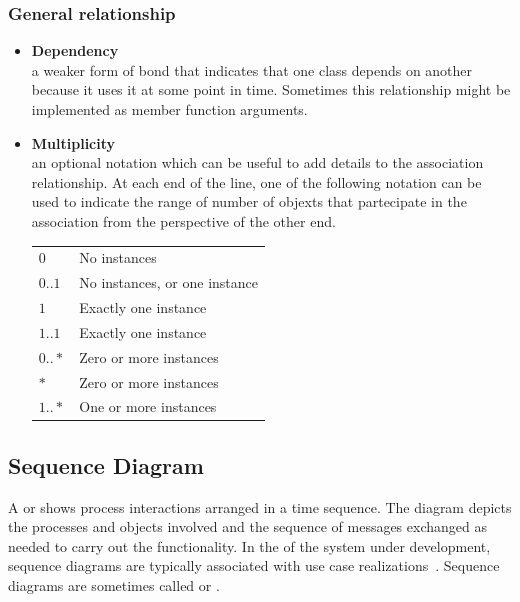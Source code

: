     \subsubsection{General relationship}
    \begin{itemize}
        \item \textbf{Dependency}\\
              a weaker form of bond that indicates that one class depends 
              on another because it uses it at some point in time. 
              Sometimes this relationship might be implemented as member 
              function arguments.
        \item \textbf{Multiplicity}\\
              an optional notation which can be 
              useful to add details to the association relationship. At 
              each end of the line, one of the following notation can be 
              used to indicate the range of number of objexts that 
              partecipate in the association from the perspective of the 
              other end.
             \begin{table}[ht]
                 \begin{center}
                     \begin{tabular}{l l}
                         $0$ & No instances\\
                         $0..1$ \quad & No instances, or one instance\\
                         $1$ & Exactly one instance\\
                         $1..1$ & Exactly one instance\\
                         $0..*$ & Zero or more instances\\
                         $*$ & Zero or more instances\\
                         $1..*$ & One or more instances\\
                     \end{tabular}
                 \end{center}
             \end{table}
    \end{itemize}

    \newpage
    \subsection{Sequence Diagram}
    
    A  or  shows process 
    interactions arranged in a time sequence. The diagram depicts the 
    processes and objects involved and the sequence of messages exchanged 
    as needed to carry out the functionality. 
    \newline
    In the  of the system under 
    development, sequence diagrams are typically associated with use case 
    realizations~\cite{wiki-4+1-view-model}. 
    \newline
    Sequence diagrams are sometimes called  or 
    . 
    
